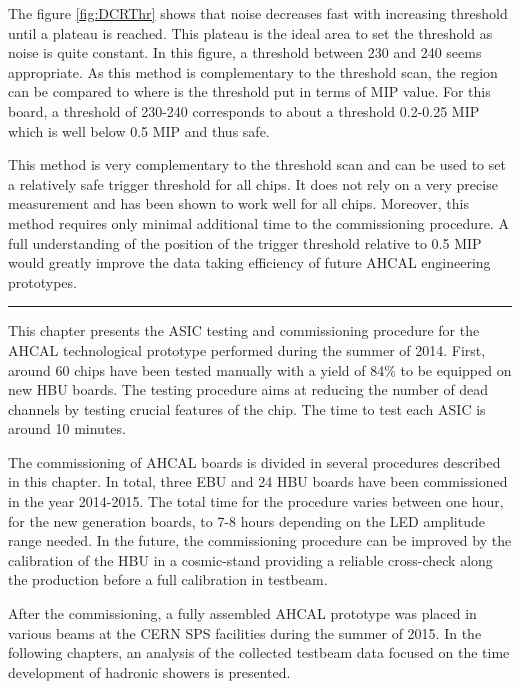 The figure \ref{fig:DCRThr} shows that noise decreases fast with increasing threshold until a plateau is reached. This plateau is the ideal area to set the threshold as noise is quite constant. In this figure, a threshold between 230 and 240 seems appropriate. As this method is complementary to the threshold scan, the region can be compared to where is the threshold put in terms of MIP value. For this board, a threshold of 230-240 corresponds to about a threshold 0.2-0.25 MIP which is well below 0.5 MIP and thus safe.

This method is very complementary to the threshold scan and can be used to set a relatively safe trigger threshold for all chips. It does not rely on a very precise measurement and has been shown to work well for all chips. Moreover, this method requires only minimal additional time to the commissioning procedure. A full understanding of the position of the trigger threshold relative to 0.5 MIP would greatly improve the data taking efficiency of future AHCAL engineering prototypes.

\begin{center}
  \rule{0.5\textwidth}{.4pt}
\end{center}

This chapter presents the ASIC testing and commissioning procedure for the AHCAL technological prototype performed during the summer of 2014. First, around 60 chips have been tested manually with a yield of 84\% to be equipped on new HBU boards. The testing procedure aims at reducing the number of dead channels by testing crucial features of the chip. The time to test each ASIC is around 10 minutes.

The commissioning of AHCAL boards is divided in several procedures described in this chapter. In total, three EBU and 24 HBU boards have been commissioned in the year 2014-2015. The total time for the procedure varies between one hour, for the new generation boards, to 7-8 hours depending on the LED amplitude range needed. In the future, the commissioning procedure can be improved by the calibration of the HBU in a cosmic-stand providing a reliable cross-check along the production before a full calibration in testbeam.

After the commissioning, a fully assembled AHCAL prototype was placed in various beams at the CERN SPS facilities during the summer of 2015. In the following chapters, an analysis of the collected testbeam data focused on the time development of hadronic showers is presented.
